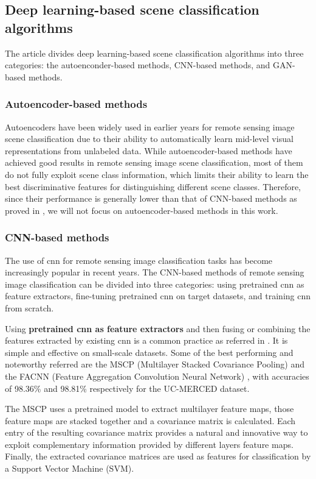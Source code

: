 \subsection{Deep learning-based scene classification algorithms}

The article \cite{cheng2020remote} divides deep learning-based scene classification
algorithms into three categories: the autoenconder-based methods, CNN-based methods,
and GAN-based methods.

\subsubsection{Autoencoder-based methods}
Autoencoders have been widely used in earlier years for remote sensing image scene classification due
to their ability to automatically learn mid-level visual representations from unlabeled data.
While autoencoder-based methods have achieved good results in remote sensing image scene
classification, most of them do not fully exploit scene class information, which limits their
ability to learn the best discriminative features for distinguishing different scene classes.
Therefore, since their performance is generally lower than that of CNN-based methods as proved in
\cite{cheng2020remote}, we will not focus on autoencoder-based methods in this work.

\subsubsection{CNN-based methods}
The use of \gls{cnn} for remote sensing image classification tasks has become increasingly
popular in recent years. The CNN-based methods of remote sensing image classification
can be divided into three categories: using pretrained \gls{cnn} as feature extractors, fine-tuning
pretrained \gls{cnn} on target datasets, and training \gls{cnn} from scratch.

\smallskip

Using \textbf{pretrained \gls{cnn} as feature extractors} and then fusing or combining the features
extracted by existing \gls{cnn} is a common practice as referred in \cite{cheng2020remote}. It
is simple and effective on small-scale datasets. Some of the best performing and
noteworthy referred are the MSCP (Multilayer Stacked Covariance Pooling) \cite{MSCP} and
the FACNN (Feature Aggregation Convolution Neural Network) \cite{FACNN}, with accuracies
of 98.36\% and 98.81\% respectively for the UC-MERCED dataset.

The MSCP uses a pretrained model to extract multilayer feature maps, those feature maps are
stacked together and a covariance matrix is calculated. Each entry of the resulting covariance
matrix provides a natural and innovative way to exploit complementary information provided
by different layers feature maps. Finally, the extracted covariance matrices are used as features
for classification by a Support Vector Machine (SVM).

